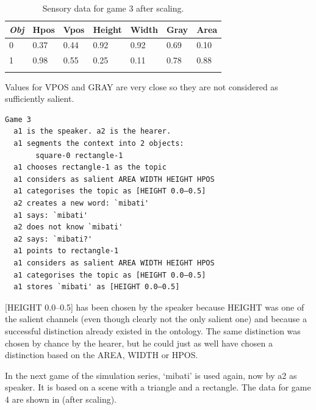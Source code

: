 \begin{table}
\begin{center}
\begin{tabular}{ l  l  l  l  l  l  l }
\lsptoprule
{\itshape Obj} & Hpos & Vpos & Height & Width & Gray & Area \\ \midrule
0 & 0.37 & 0.44 & 0.92 & 0.92 & 0.69 & 0.10\\ 
1 & 0.98 & 0.55 & 0.25 & 0.11 & 0.78 & 0.88\\ 
\lspbottomrule
\end{tabular}
\caption{\label{tab:game3}Sensory data for game 3 after scaling.}
\end{center}
\end{table}
Values for VPOS and GRAY are very close so they are not 
considered as sufficiently salient.
\begin{verbatim}
Game 3
  a1 is the speaker. a2 is the hearer. 
  a1 segments the context into 2 objects: 
       square-0 rectangle-1 
  a1 chooses rectangle-1 as the topic 
  a1 considers as salient AREA WIDTH HEIGHT HPOS 
  a1 categorises the topic as [HEIGHT 0.0–0.5]
  a2 creates a new word: `mibati'
  a1 says: `mibati'
  a2 does not know `mibati'
  a2 says: `mibati?'
  a1 points to rectangle-1
  a1 considers as salient AREA WIDTH HEIGHT HPOS 
  a1 categorises the topic as [HEIGHT 0.0–0.5]
  a1 stores `mibati' as [HEIGHT 0.0–0.5]
\end{verbatim}
{}[HEIGHT 0.0–0.5] has been chosen by the speaker
because HEIGHT was one of the salient channels (even 
though clearly not the only salient one) and 
because a successful distinction already existed in 
the ontology. The same 
distinction was chosen by chance by the hearer, but he 
could just as well have chosen a distinction based on 
the AREA, WIDTH or HPOS. 

In the next game of the simulation series, `mibati'
is used again, now by {\bfshape  a2} as speaker. It is 
based on a scene with a triangle and a rectangle.
The data for game 4 are shown in  (after scaling).  


